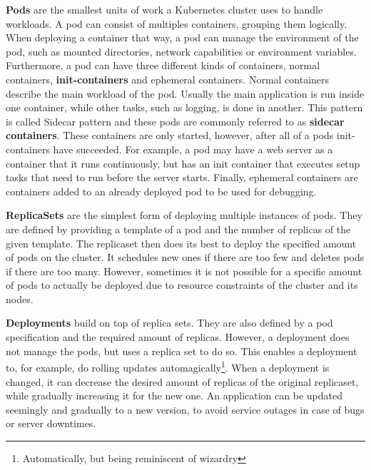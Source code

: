 \textbf{Pods}\cite{kubernetes-pods} are the smallest units of work a Kubernetes cluster uses to handle workloads.
A pod can consist of multiples containers, grouping them logically.
When deploying a container that way, a pod can manage the environment of the pod, such as mounted directories, network capabilities or environment variables.
Furthermore, a pod can have three different kinds of containers, normal containers, \textbf{init-containers} and ephemeral containers.
Normal containers describe the main workload of the pod.
Usually the main application is run inside one container, while other tasks, such as logging, is done in another.
This pattern is called Sidecar pattern and these pods are commonly referred to as \textbf{sidecar containers}\cite{sidecar-container}.
These containers are only started, however, after all of a pods init-containers have succeeded.
For example, a pod may have a web server as a container that it runs continuously, but has an init container that executes setup tasks that need to run before the server starts.
Finally, ephemeral containers are containers added to an already deployed pod to be used for debugging.

\pagebreak

\textbf{ReplicaSets}\cite{kubernetes-replicaset} are the simplest form of deploying multiple instances of pods.
They are defined by providing a template of a pod and the number of replicas of the given template.
The replicaset then does its best to deploy the specified amount of pods on the cluster.
It schedules new ones if there are too few and deletes pods if there are too many.
However, sometimes it is not possible for a specific amount of pods to actually be deployed due to resource constraints of the cluster and its nodes.

\textbf{Deployments}\cite{kubernetes-deployments} build on top of replica sets.
They are also defined by a pod specification and the required amount of replicas.
However, a deployment does not manage the pods, but uses a replica set to do so.
This enables a deployment to, for example, do rolling updates automagically\footnote{Automatically, but being reminiscent of wizardry}.
When a deployment is changed, it can decrease the desired amount of replicas of the original replicaset, while gradually increasing it for the new one.
An application can be updated seemingly and gradually to a new version, to avoid service outages in case of bugs or server downtimes.


